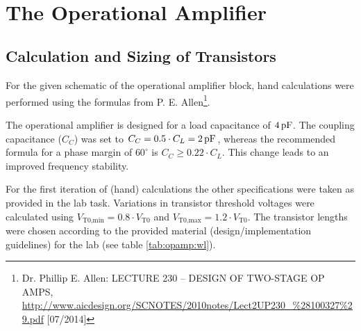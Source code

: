\documentclass[parskip,oneside,colorbacktitle,10pt,accentcolor=tud1b]{tudreport}
\begin{document}
{\begin{figure}[H]
\begin{center}
{        }\\
    \end{center}
\end{figure}


\chapter{The Operational Amplifier}

\section{Calculation and Sizing of Transistors}

For the given schematic of the operational amplifier block, hand calculations were performed using the formulas from P. E. Allen\footnote{Dr. Phillip E. Allen: \glqq LECTURE 230 – DESIGN OF TWO-STAGE OP AMPS\grqq, \url{http://www.aicdesign.org/SCNOTES/2010notes/Lect2UP230\_\%28100327\%29.pdf} [07/2014]}.

The operational amplifier is designed for a load capacitance of $\unit[4]{pF}$. The coupling capacitance ($C_C$) was set to $C_C = 0.5 \cdot C_L = \unit[2]{pF}$, whereas the recommended formula for a phase margin of $60^\circ$ is $C_C \geq 0.22 \cdot C_L$. This change leads to an improved frequency stability.

For the first iteration of (hand) calculations the other specifications were taken as provided in the lab task. Variations in transistor threshold voltages were calculated using $V_\text{T0,min} = 0.8 \cdot V_\text{T0}$ and $V_\text{T0,max} = 1.2 \cdot V_\text{T0}$. The transistor lengths were chosen according to the provided material (design/implementation guidelines) for the lab (see table \ref{tab:opamp:wl}). 

}
\end{document}
